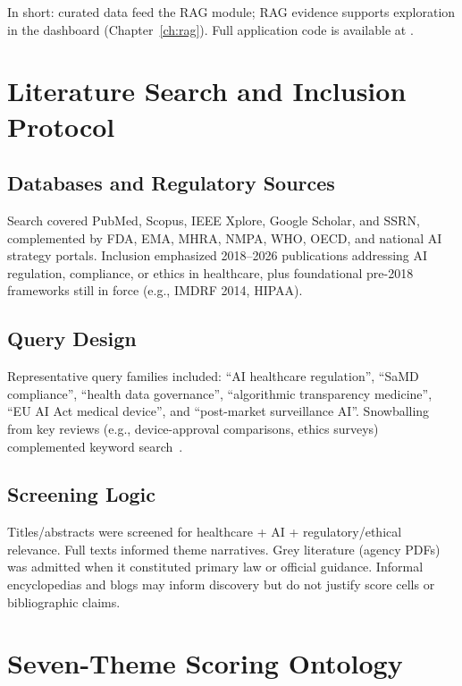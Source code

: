 In short: curated data feed the RAG module; RAG evidence supports exploration in the
dashboard (Chapter~\ref{ch:rag}). Full application code is available at
\newline\noindent\repoLink{}.

\section{Literature Search and Inclusion Protocol}
\label{sec:search}

\subsection{Databases and Regulatory Sources}

Search covered PubMed, Scopus, IEEE Xplore, Google Scholar, and SSRN, complemented by FDA, EMA, MHRA, NMPA, WHO, OECD, and national AI strategy portals. Inclusion emphasized 2018--2026 publications addressing AI regulation, compliance, or ethics in healthcare, plus foundational pre-2018 frameworks still in force (e.g., IMDRF 2014, HIPAA).

\subsection{Query Design}

Representative query families included: ``AI healthcare regulation'', ``SaMD compliance'', ``health data governance'', ``algorithmic transparency medicine'', ``EU AI Act medical device'', and ``post-market surveillance AI''. Snowballing from key reviews (e.g., device-approval comparisons, ethics surveys) complemented keyword search~\cite{muehlematter2021,jobin2019}.

\subsection{Screening Logic}

Titles/abstracts were screened for healthcare + AI + regulatory/ethical relevance. Full texts informed theme narratives. Grey literature (agency PDFs) was admitted when it constituted primary law or official guidance. Informal encyclopedias and blogs may inform discovery but do not justify score cells or bibliographic claims.

\section{Seven-Theme Scoring Ontology}
\label{sec:ontology}

